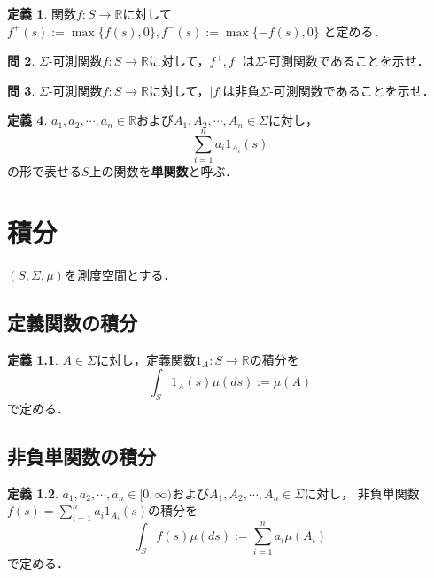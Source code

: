 \documentclass{jsreport}
\theoremstyle{definition}
\newtheorem{defi}{定義}[section]
\newtheorem{qst}[defi]{問}
\begin{document}
\begin{defi}\label{def_positive_and_negative_part}
関数$f \colon S\to\mathbb{R}$に対して
$f^+(s):=\max\{f(s),0\}, f^-(s):=\max\{-f(s),0\}$
と定める．
\end{defi}

\begin{qst}\label{qst_positive_and_negative_part_are_measurable}
$\Sigma$-可測関数$f \colon S\to\mathbb{R}$に対して，$f^+,f^-$は$\Sigma$-可測関数であることを示せ．
\end{qst}

\begin{qst}\label{qst_absolute_is_measurable}
$\Sigma$-可測関数$f \colon S\to\mathbb{R}$に対して，$|f|$は非負$\Sigma$-可測関数であることを示せ．
\end{qst}

\begin{defi}\label{def_simple_function}
$a_1,a_2,\cdots,a_n\in\mathbb{R}$および$A_1,A_2,\cdots,A_n\in\Sigma$に対し，
\[ \sum_{i=1}^n a_i1_{A_i}(s) \]
の形で表せる$S$上の関数を\textbf{単関数}と呼ぶ．
\end{defi}

\chapter{積分}

$(S,\Sigma,\mu)$を測度空間とする．

\section{定義関数の積分}

\begin{defi}\label{def_indicator_function_integral}
$A\in\Sigma$に対し，定義関数$1_A \colon S\to\mathbb{R}$の積分を
\[ \int_S 1_A(s)\mu(ds):=\mu(A) \]
で定める．
\end{defi}

\section{非負単関数の積分}

\begin{defi}\label{def_nonnegative_simple_function_integral}
$a_1,a_2,\cdots,a_n\in[0,\infty)$および$A_1,A_2,\cdots,A_n\in\Sigma$に対し，
非負単関数$f(s)=\displaystyle\sum_{i=1}^n a_i1_{A_i}(s)$の積分を
\[ \int_S f(s)\mu(ds):=\sum_{i=1}^n a_i\mu(A_i) \]
で定める．
\end{defi}
\end{document}
